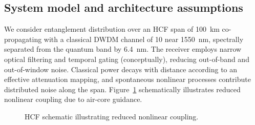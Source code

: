 \documentclass{article}
\newcommand{\simL}{100}
\newcommand{\simpcl}{10}
\newcommand{\simsep}{6.4}
\begin{document}
\subsection{System model and architecture assumptions}
We consider entanglement distribution over an HCF span of \SI{\simL}{\kilo\meter} co-propagating with a classical DWDM channel of \SI{\simpcl}{\dBm} near \SI{1550}{\nano\meter}, spectrally separated from the quantum band by \SI{\simsep}{\nano\meter}. The receiver employs narrow optical filtering and temporal gating (conceptually), reducing out-of-band and out-of-window noise. Classical power decays with distance according to an effective attenuation mapping, and spontaneous nonlinear processes contribute distributed noise along the span. Figure~\ref{fig:hcf} schematically illustrates reduced nonlinear coupling due to air-core guidance.

\begin{figure}[ht]
\centering
\begin{adjustbox}{max width=\linewidth}
\end{adjustbox}
\caption{HCF schematic illustrating reduced nonlinear coupling.}
\label{fig:hcf}

\end{figure}
\end{document}
